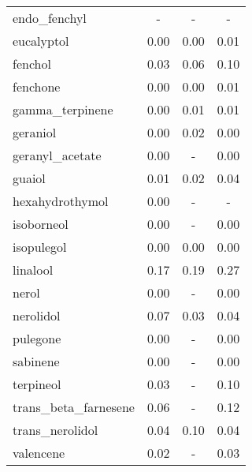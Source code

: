 \begin{table}[H]
\begin{tabular}{lccc}
endo\_fenchyl & - & - & - \\
eucalyptol & 0.00 & 0.00 & 0.01 \\
fenchol & 0.03 & 0.06 & 0.10 \\
fenchone & 0.00 & 0.00 & 0.01 \\
gamma\_terpinene & 0.00 & 0.01 & 0.01 \\
geraniol & 0.00 & 0.02 & 0.00 \\
geranyl\_acetate & 0.00 & - & 0.00 \\
guaiol & 0.01 & 0.02 & 0.04 \\
hexahydrothymol & 0.00 & - & - \\
isoborneol & 0.00 & - & 0.00 \\
isopulegol & 0.00 & 0.00 & 0.00 \\
linalool & 0.17 & 0.19 & 0.27 \\
nerol & 0.00 & - & 0.00 \\
nerolidol & 0.07 & 0.03 & 0.04 \\
pulegone & 0.00 & - & 0.00 \\
sabinene & 0.00 & - & 0.00 \\
terpineol & 0.03 & - & 0.10 \\
trans\_beta\_farnesene & 0.06 & - & 0.12 \\
trans\_nerolidol & 0.04 & 0.10 & 0.04 \\
valencene & 0.02 & - & 0.03 \\
\hline
\end{tabular}
\end{table}
